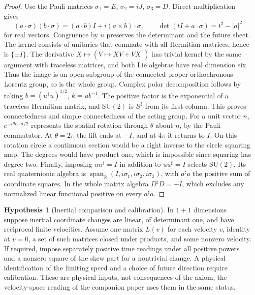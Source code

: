 \documentclass[11pt,reqno]{amsart}
\theoremstyle{definition}
\newtheorem{hypothesis}[theorem]{Hypothesis}
\theoremstyle{remark}
\numberwithin{equation}{section}
\newcommand{\R}{\mathbb{R}}
\begin{document}
\begin{proof}
Use the Pauli matrices \(\sigma_1=E\),
\(\sigma_2=iJ\), \(\sigma_3=D\). Direct multiplication gives
\[
 (a\cdot\sigma)(b\cdot\sigma)=(a\cdot b)I+i(a\times b)\cdot\sigma,\qquad
 \det(tI+a\cdot\sigma)=t^2-|a|^2
\]
for real vectors. Congruence by \(u\) preserves the determinant and
the future sheet. The kernel consists of unitaries that commute with
all Hermitian matrices, hence is \(\{\pm I\}\). The derivative
\(X\mapsto (V\mapsto XV+VX^\dagger)\) has trivial kernel by the
same argument with traceless matrices, and both Lie algebras have real
dimension six. Thus the image is an open subgroup of the connected
proper orthochronous Lorentz group, so is the whole group. Complex polar
decomposition follows by taking \(b=(u^\dagger u)^{1/2}\),
\(k=ub^{-1}\). The positive factor is the exponential of a traceless
Hermitian matrix, and \(\mathrm{SU}(2)\) is \(S^3\) from its first column.
This proves connectedness and simple connectedness of the acting group.
For a unit vector \(n\), \(e^{-i\theta n\cdot\sigma/2}\) represents
the spatial rotation through \(\theta\) about \(n\), by the Pauli
commutator. At \(\theta=2\pi\) the lift ends at \(-I\), and at
\(4\pi\) it returns to \(I\). On this rotation circle a continuous
section would be a right inverse to the circle squaring map.
The degrees would have product one, which is impossible since
squaring has degree two.
Finally, imposing \(uu^\dagger=I\) in addition to \(uu^\sharp=I\)
selects \(\mathrm{SU}(2)\). Its real quaternionic algebra is
\(\operatorname{span}_{\R}(I,i\sigma_1,i\sigma_2,i\sigma_3)\), with
\(a^\sharp a\) the positive sum of coordinate squares. In the whole
matrix algebra \(D^\sharp D=-I\), which excludes any normalized
linear functional positive on every \(a^\sharp a\).
\end{proof}

\begin{hypothesis}[Inertial comparison and calibration]\label{m3:calibration}
In \(1+1\) dimensions suppose inertial coordinate changes are linear,
of determinant one, and have reciprocal finite velocities. Assume one
matrix \(L(v)\) for each velocity \(v\), identity at \(v=0\), a set of
such matrices closed under products, and some nonzero velocity.
If required, impose separately positive time readings under all positive
powers and a nonzero square of the skew part for a nontrivial change.
A physical identification of the limiting speed and a choice of future
direction require calibration.  These are physical inputs, not consequences of the axiom; the velocity-space reading of the companion
paper \cite[Thm.~53]{Companion} uses them in the same status.
\end{hypothesis}
\end{document}

